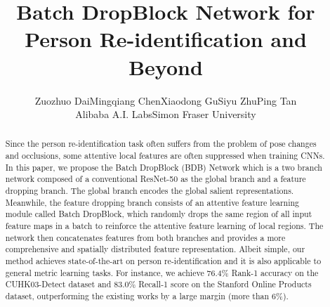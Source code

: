 \documentclass[10pt,twocolumn,letterpaper]{article}
\begin{document}
\title{Batch DropBlock Network for Person Re-identification and Beyond}
\vspace{-2mm}
\author{Zuozhuo Dai\hspace{1cm}Mingqiang Chen\hspace{1cm}Xiaodong Gu\hspace{1cm}Siyu Zhu\hspace{1cm}Ping Tan\\
Alibaba A.I. Labs\hspace{1.5cm}Simon Fraser University
}

\maketitle
\pagestyle{plain}

\begin{abstract}

Since the person re-identification task often suffers from the problem of pose changes and occlusions, some attentive local features are often suppressed when training CNNs. 
In this paper, we propose the Batch DropBlock (BDB) Network which is a two branch network composed of a conventional ResNet-50 as the global branch and a feature dropping branch.
The global branch encodes the global salient representations.
Meanwhile, the feature dropping branch consists of an attentive feature learning module called Batch DropBlock,
which randomly drops the same region of all input feature maps in a batch to reinforce the attentive feature learning of local regions.
The network then concatenates features from both branches and provides a more comprehensive and spatially distributed feature representation.
Albeit simple, our method achieves state-of-the-art on person re-identification and it is also applicable to general metric learning tasks. For instance, we achieve 76.4\% Rank-1 accuracy on the CUHK03-Detect dataset and 83.0\% Recall-1 score on the Stanford Online Products dataset, outperforming the existing works by a large margin (more than 6\%).


\end{abstract}
\end{document}
